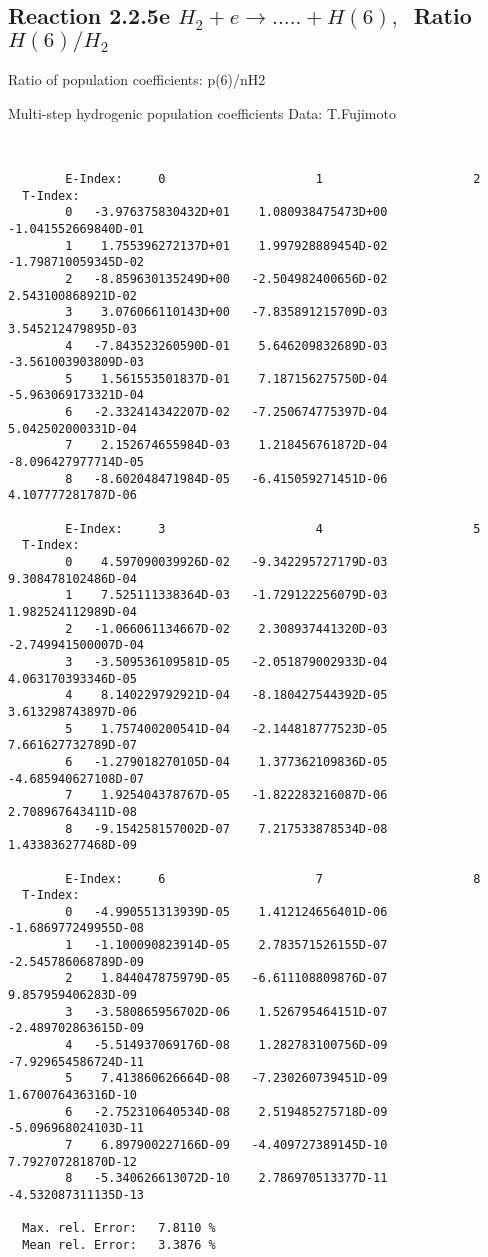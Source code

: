 \documentclass[12pt]{article}
\begin{document}
\newpage
\subsection{
Reaction 2.2.5e  $H_2 + e \rightarrow .....+H(6)   , \  $
Ratio $H(6)/H_2 $
}

 Ratio of population coefficients: p(6)/nH2

 Multi-step hydrogenic population coefficients
 Data: T.Fujimoto


\begin{small}\begin{verbatim}


        E-Index:     0                     1                     2
  T-Index:
        0   -3.976375830432D+01    1.080938475473D+00   -1.041552669840D-01
        1    1.755396272137D+01    1.997928889454D-02   -1.798710059345D-02
        2   -8.859630135249D+00   -2.504982400656D-02    2.543100868921D-02
        3    3.076066110143D+00   -7.835891215709D-03    3.545212479895D-03
        4   -7.843523260590D-01    5.646209832689D-03   -3.561003903809D-03
        5    1.561553501837D-01    7.187156275750D-04   -5.963069173321D-04
        6   -2.332414342207D-02   -7.250674775397D-04    5.042502000331D-04
        7    2.152674655984D-03    1.218456761872D-04   -8.096427977714D-05
        8   -8.602048471984D-05   -6.415059271451D-06    4.107777281787D-06

        E-Index:     3                     4                     5
  T-Index:
        0    4.597090039926D-02   -9.342295727179D-03    9.308478102486D-04
        1    7.525111338364D-03   -1.729122256079D-03    1.982524112989D-04
        2   -1.066061134667D-02    2.308937441320D-03   -2.749941500007D-04
        3   -3.509536109581D-05   -2.051879002933D-04    4.063170393346D-05
        4    8.140229792921D-04   -8.180427544392D-05    3.613298743897D-06
        5    1.757400200541D-04   -2.144818777523D-05    7.661627732789D-07
        6   -1.279018270105D-04    1.377362109836D-05   -4.685940627108D-07
        7    1.925404378767D-05   -1.822283216087D-06    2.708967643411D-08
        8   -9.154258157002D-07    7.217533878534D-08    1.433836277468D-09

        E-Index:     6                     7                     8
  T-Index:
        0   -4.990551313939D-05    1.412124656401D-06   -1.686977249955D-08
        1   -1.100090823914D-05    2.783571526155D-07   -2.545786068789D-09
        2    1.844047875979D-05   -6.611108809876D-07    9.857959406283D-09
        3   -3.580865956702D-06    1.526795464151D-07   -2.489702863615D-09
        4   -5.514937069176D-08    1.282783100756D-09   -7.929654586724D-11
        5    7.413860626664D-08   -7.230260739451D-09    1.670076436316D-10
        6   -2.752310640534D-08    2.519485275718D-09   -5.096968024103D-11
        7    6.897900227166D-09   -4.409727389145D-10    7.792707281870D-12
        8   -5.340626613072D-10    2.786970513377D-11   -4.532087311135D-13

  Max. rel. Error:   7.8110 %
  Mean rel. Error:   3.3876 %

\end{verbatim}\end{small}
\end{document}
